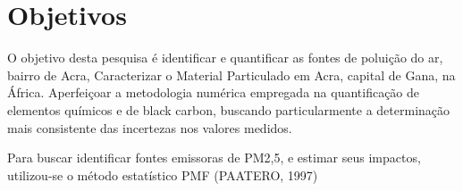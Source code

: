 \section{Objetivos}

O objetivo desta pesquisa é identificar e quantificar 
as fontes de poluição do ar, bairro de Acra,  
Caracterizar o Material Particulado em Acra, capital de Gana, na África.
Aperfeiçoar a metodologia numérica empregada na quantificação de elementos 
químicos e de black carbon, buscando particularmente a determinação mais
consistente das incertezas nos valores medidos.

Para buscar identificar fontes emissoras de PM2,5, e estimar seus impactos, utilizou-se o método estatístico PMF (PAATERO, 1997)
